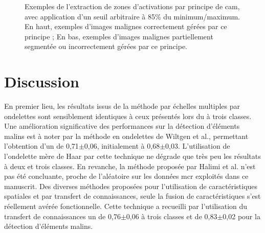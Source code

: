 \begin{figure}[H]
    \caption{Exemples de l'extraction de zones d'activations par principe de \gls{cam}, avec application d'un seuil arbitraire à 85\% du minimum/maximum. En haut, exemples d'images malignes correctement gérées par ce principe ; En bas, exemples d'images malignes partiellement segmentée ou incorrectement gérées par ce principe.}
    \label{fig:example_image_improvement_ft}
\end{figure}\par

\clearpage

\section{Discussion}
En premier lieu, les résultats issus de la méthode par échelles multiples par ondelettes sont sensiblement identiques à ceux présentés lors du  à trois classes. Une amélioration significative des performances sur la détection d'éléments malins est à noter par la méthode en ondelettes de Wiltgen et al., permettant l'obtention d'un \fscore{} de 0,71$\pm$0,06, initialement à 0,68$\pm$0,03. L'utilisation de l'ondelette mère de Haar par cette technique ne dégrade que très peu les résultats à deux et trois classes. En revanche, la méthode proposée par Halimi et al. n'est pas été concluante, proche de l'aléatoire sur les données \gls{mcr} exploités dans ce manuscrit. Des diverses méthodes proposées pour l'utilisation de caractéristiques spatiales et par transfert de connaissances, seule la fusion de caractéristiques s'est réellement avérée fonctionnelle. Cette technique a recueilli par l'utilisation du transfert de connaissances un \fscore{} de 0,76$\pm$0,06 à trois classes et de 0,83$\pm$0,02 pour la détection d'éléments malins.\par

